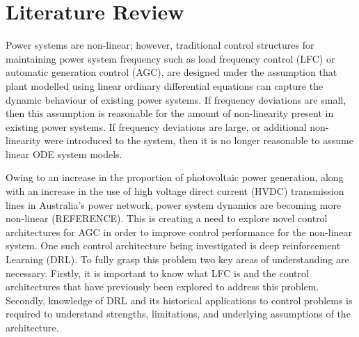 \section{Literature Review}
Power systems are non-linear; however, traditional control structures for maintaining power system frequency such as load frequency control (LFC) or automatic generation control (AGC), are designed under the assumption that plant modelled using linear ordinary differential equations can capture the dynamic behaviour of existing power systems. If frequency deviations are small, then this assumption is reasonable for the amount of non-linearity present in existing power systems. If frequency deviations are large, or additional non-linearity were introduced to the system, then it is no longer reasonable to assume linear ODE system models.

Owing to an increase in the proportion of photovoltaic power generation, along with an increase in the use of high voltage direct current (HVDC) transmission lines in Australia's power network, power system dynamics are becoming more non-linear (REFERENCE). This is creating a need to explore novel control architectures for AGC in order to improve control performance for the non-linear system. One such control architecture being investigated is deep reinforcement Learning (DRL). To fully grasp this problem two key areas of understanding are necessary. Firstly, it is important to know what LFC is and the control architectures that have previously been explored to address this problem. Secondly, knowledge of DRL and its historical applications to control problems is required to understand strengths, limitations, and underlying assumptions of the architecture.


